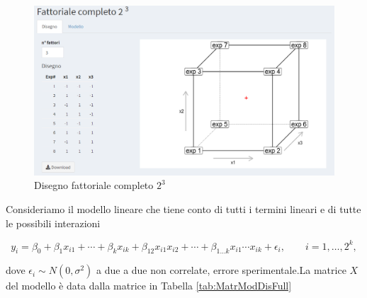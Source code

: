 \documentclass[
  11pt,
]{book}
\begin{document}
\begin{figure}

{\centering \includegraphics[width=1\linewidth]{Immagini/Fatt_compl/02_fattacompl3liv} 

}

\caption{Disegno fattoriale completo $2^3$}\label{fig:fc2}
\end{figure}

Consideriamo il modello lineare che tiene conto di tutti i termini
lineari e di tutte le possibili interazioni

\begin{equation}
y_i=\beta_0+\beta_1x_{i1}+\cdots+\beta_kx_{ik}+\beta_{12}x_{i1}x_{i2}+\cdots+\beta_{1\dots
k}x_{i1} \cdots x_{ik}+\epsilon_i, \qquad i=1,\dots,2^k, 
\label{eq:ModDisFull}
\end{equation}

dove \(\epsilon_i\sim N(0,\sigma^2)\) a due a due non correlate, errore
sperimentale.\newline La matrice \(X\) del modello è data dalla matrice in Tabella \ref{tab:MatrModDisFull}
\end{document}
